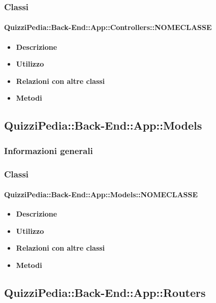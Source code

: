 \subsubsection{Classi}
\paragraph{QuizziPedia::Back-End::App::Controllers::NOMECLASSE}
	\begin{itemize}
		\item \textbf{Descrizione} \\
		\item \textbf{Utilizzo} \\
		\item \textbf{Relazioni con altre classi} \\
		\item \textbf{Metodi} \\
	\end{itemize}


\subsection{QuizziPedia::Back-End::App::Models}
\subsubsection{Informazioni generali}
\subsubsection{Classi}
\paragraph{QuizziPedia::Back-End::App::Models::NOMECLASSE}
\begin{itemize}
	\item \textbf{Descrizione} \\
	\item \textbf{Utilizzo} \\
	\item \textbf{Relazioni con altre classi} \\
	\item \textbf{Metodi} \\
\end{itemize}

\subsection{QuizziPedia::Back-End::App::Routers}
